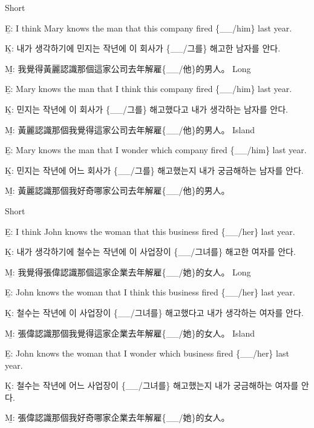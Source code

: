 \pex %
\a Short\par\nobreak
\beginsubsub
\b{E:} I think Mary knows the man that this company fired \{\_\_/him\} last year.\par\nobreak
\b{K:} \ko 내가 생각하기에 민지는 작년에 이 회사가 \{\_\_/그를\} 해고한 남자를 안다. \normalfont\par\nobreak
\b{M:} \zh 我覺得黃麗認識那個這家公司去年解雇\{\_\_/他\}的男人。 \normalfont
\endsubsub
\a Long\par\nobreak
\beginsubsub
\b{E:} Mary knows the man that I think this company fired \{\_\_/him\} last year.\par\nobreak
\b{K:} \ko 민지는 작년에 이 회사가 \{\_\_/그를\} 해고했다고 내가 생각하는 남자를 안다. \normalfont\par\nobreak
\b{M:} \zh 黃麗認識那個我覺得這家公司去年解雇\{\_\_/他\}的男人。 \normalfont
\endsubsub
\a Island\par\nobreak
\beginsubsub
\b{E:} Mary knows the man that I wonder which company fired \{\_\_/him\} last year.\par\nobreak
\b{K:} \ko 민지는 작년에 어느 회사가 \{\_\_/그를\} 해고했는지 내가 궁금해하는 남자를 안다\normalfont.\par\nobreak
\b{M:} \zh 黃麗認識那個我好奇哪家公司去年解雇\{\_\_/他\}的男人。\normalfont
\endsubsub
\xe

\pex %
\a Short\par\nobreak
\beginsubsub
\b{E:} I think John knows the woman that this business fired \{\_\_/her\} last year.\par\nobreak
\b{K:} \ko 내가 생각하기에 철수는 작년에 이 사업장이 \{\_\_/그녀를\} 해고한 여자를 안다. \normalfont\par\nobreak
\b{M:} \zh 我覺得張偉認識那個這家企業去年解雇\{\_\_/她\}的女人。 \normalfont
\endsubsub
\a Long\par\nobreak
\beginsubsub
\b{E:} John knows the woman that I think this business fired \{\_\_/her\} last year.\par\nobreak
\b{K:} \ko 철수는 작년에 이 사업장이 \{\_\_/그녀를\} 해고했다고 내가 생각하는 여자를 안다. \normalfont\par\nobreak
\b{M:} \zh 張偉認識那個我覺得這家企業去年解雇\{\_\_/她\}的女人。 \normalfont
\endsubsub
\a Island\par\nobreak
\beginsubsub
\b{E:} John knows the woman that I wonder which business fired \{\_\_/her\} last year.\par\nobreak
\b{K:} \ko 철수는 작년에 어느 사업장이 \{\_\_/그녀를\} 해고했는지 내가 궁금해하는 여자를 안다\normalfont.\par\nobreak
\b{M:} \zh 張偉認識那個我好奇哪家企業去年解雇\{\_\_/她\}的女人。\normalfont
\endsubsub
\xe


